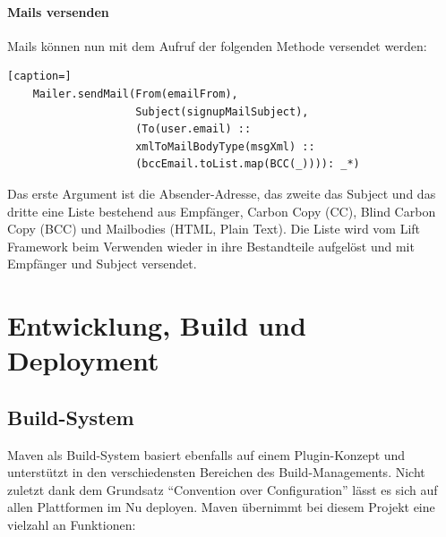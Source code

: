  \subsubsection{Mails versenden}
  Mails k\"onnen nun mit dem Aufruf der folgenden Methode versendet werden:
\begin{lstlisting}[caption=]
    Mailer.sendMail(From(emailFrom), 
                    Subject(signupMailSubject),
                    (To(user.email) :: 
                    xmlToMailBodyType(msgXml) ::
                    (bccEmail.toList.map(BCC(_)))): _*)
\end{lstlisting} 

Das erste Argument ist die Absender-Adresse, das zweite das Subject und das dritte eine Liste bestehend aus Empf\"anger, Carbon Copy (CC), Blind Carbon Copy (BCC) und Mailbodies (HTML, Plain Text). Die Liste wird vom Lift Framework beim Verwenden wieder in ihre Bestandteile aufgel\"ost und mit Empf\"anger und Subject versendet. 

\chapter{Entwicklung, Build und Deployment}

\section{Build-System}Maven als Build-System basiert ebenfalls auf einem Plugin-Konzept und unterst\"utzt in den verschiedensten Bereichen des Build-Managements. Nicht zuletzt dank dem Grundsatz ``Convention over Configuration'' l\"asst es sich auf allen Plattformen im Nu deployen. Maven \"ubernimmt bei diesem Projekt eine vielzahl an Funktionen:

